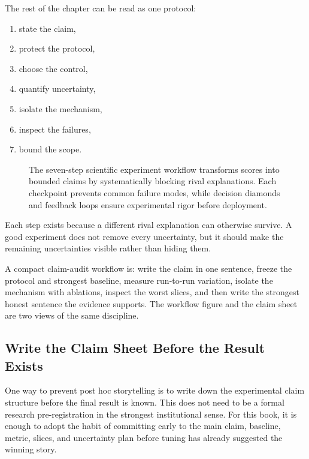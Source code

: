 The rest of the chapter can be read as one protocol:
\begin{enumerate}[leftmargin=*]
\item state the claim,
\item protect the protocol,
\item choose the control,
\item quantify uncertainty,
\item isolate the mechanism,
\item inspect the failures,
\item bound the scope.
\end{enumerate}

\begin{figure}[t]
\centering
\resizebox{\linewidth}{!}{}
\caption{The seven-step scientific experiment workflow transforms scores into bounded claims by systematically blocking rival explanations. Each checkpoint prevents common failure modes, while decision diamonds and feedback loops ensure experimental rigor before deployment.}
\label{fig:experiment-workflow}
\end{figure}

Each step exists because a different rival explanation can otherwise survive. A good experiment does not remove every uncertainty, but it should make the remaining uncertainties visible rather than hiding them.

\begin{practicalnote}
A compact claim-audit workflow is: write the claim in one sentence, freeze the protocol and strongest baseline, measure run-to-run variation, isolate the mechanism with ablations, inspect the worst slices, and then write the strongest honest sentence the evidence supports. The workflow figure and the claim sheet are two views of the same discipline.
\end{practicalnote}

\subsection{Write the Claim Sheet Before the Result Exists}

One way to prevent post hoc storytelling is to write down the experimental claim structure before the final result is known. This does not need to be a formal research pre-registration in the strongest institutional sense. For this book, it is enough to adopt the habit of committing early to the main claim, baseline, metric, slices, and uncertainty plan before tuning has already suggested the winning story.

